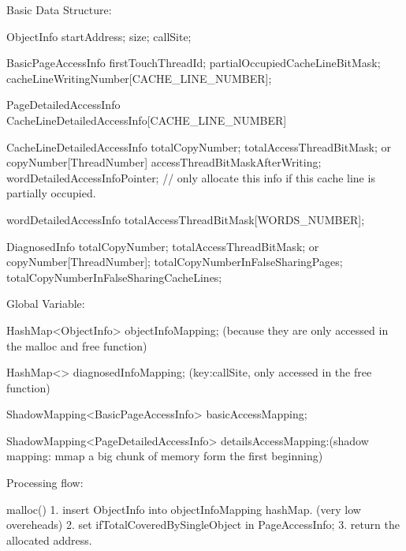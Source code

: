 Basic Data Structure:

        ObjectInfo {
            startAddress;
            size;
            callSite;
        }

        BasicPageAccessInfo{
            firstTouchThreadId;
            partialOccupiedCacheLineBitMask;
            cacheLineWritingNumber[CACHE_LINE_NUMBER];
        }

        PageDetailedAccessInfo{
            CacheLineDetailedAccessInfo[CACHE_LINE_NUMBER]
        }

        CacheLineDetailedAccessInfo {
            totalCopyNumber;
            totalAccessThreadBitMask; or copyNumber[ThreadNumber]
            accessThreadBitMaskAfterWriting;
            wordDetailedAccessInfoPointer;   // only allocate this info if this cache line is partially occupied.
        }

        wordDetailedAccessInfo {
            totalAccessThreadBitMask[WORDS_NUMBER];
        }

        DiagnosedInfo {
            totalCopyNumber;
            totalAccessThreadBitMask; or copyNumber[ThreadNumber];
            totalCopyNumberInFalseSharingPages;
            totalCopyNumberInFalseSharingCacheLines;
        }


Global Variable:

        HashMap<ObjectInfo> objectInfoMapping; (because they are only accessed in the malloc and free function)

        HashMap<> diagnosedInfoMapping; (key:callSite, only accessed in the free function)

        ShadowMapping<BasicPageAccessInfo> basicAccessMapping;

        ShadowMapping<PageDetailedAccessInfo> detailsAccessMapping:(shadow mapping: mmap a big chunk of memory form the first beginning)


Processing flow:

        malloc(){
            1. insert ObjectInfo into objectInfoMapping hashMap.   (very low overeheads)
            2. set ifTotalCoveredBySingleObject in PageAccessInfo;
            3. return the allocated address.
        }

